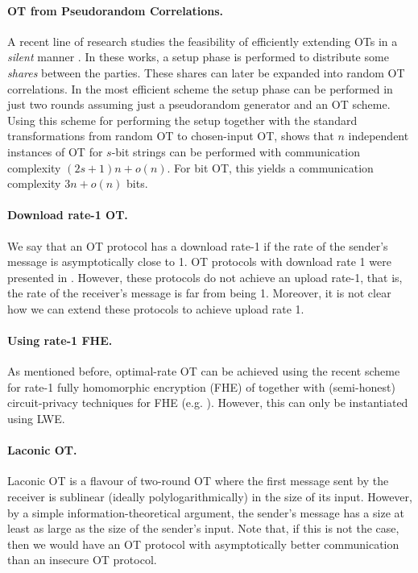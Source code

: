 \paragraph{OT from Pseudorandom Correlations.} A recent line of research studies the feasibility of efficiently extending OTs in a \emph{silent} manner \cite{C:BCGIKS19,CCS:BCGIKRS19}.
In these works, a setup phase is performed to distribute some \emph{shares} between the parties. These shares can later be expanded into random OT correlations. In the most efficient scheme \cite{CCS:BCGIKRS19} the setup phase can be performed in just two rounds assuming just a pseudorandom generator and an OT scheme. Using this scheme for performing the setup together with the standard transformations from random OT to chosen-input OT, \cite{CCS:BCGIKRS19} shows that $n$ independent instances of OT for $s$-bit strings  can be performed with communication complexity $(2s+1)n+o(n)$. For bit OT, this yields a communication complexity $3n+o(n)$ bits.

\paragraph{Download rate-1 OT.} We say that an OT protocol has a download rate-1 if the rate of the sender's message is asymptotically close to 1. OT protocols with download rate 1 were presented in \cite{C:DGIMMO19,TCC:GarHajOst20,TCC:CGHLM21}.%
However, these protocols do not achieve an upload rate-1, that is, the rate of the receiver's message is far from being 1. Moreover, it is not clear how we can extend these protocols to achieve upload rate 1.


\paragraph{Using rate-1 FHE.} As mentioned before, optimal-rate OT can be achieved using the recent scheme for rate-1 fully homomorphic encryption (FHE) of \cite{TCC:BDGM19,TCC:GenHal19} together with (semi-honest) circuit-privacy techniques for FHE (e.g. \cite{C:BdMW16}). However, this can only be instantiated using LWE. 


\paragraph{Laconic OT.} Laconic OT \cite{C:CDGGMP17,FOCS:QuaWeeWic18,C:GoyVusWat20,TCC:ABDGHP21} is a flavour of two-round OT where the first message sent by the receiver is sublinear (ideally polylogarithmically) in the size of its input. However, by a simple information-theoretical argument, the sender's message has a size at least as large as the size of the sender's input. Note that, if this is not the case, then we would have an OT protocol with asymptotically better communication than an insecure OT protocol.

